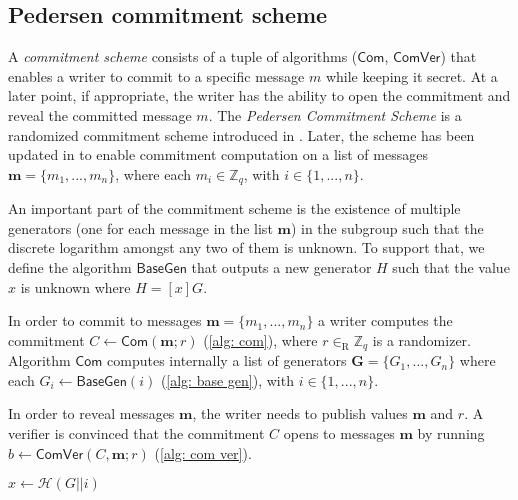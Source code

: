 \clearpage
\subsection{Pedersen commitment scheme}
A \textit{commitment scheme} consists of a tuple of algorithms ($\mathsf{Com}$, $\mathsf{ComVer}$) that enables a writer to commit to a specific message $m$ while keeping it secret. At a later point, if appropriate, the writer has the ability to open the commitment and reveal the committed message $m$. The \textit{Pedersen Commitment Scheme} is a randomized commitment scheme introduced in \cite{Pedersen91-commitment}. Later, the scheme has been updated in \cite{Bootle18} to enable commitment computation on a list of messages $\boldsymbol{m} = \{m_1, ..., m_n\}$, where each $m_i \in \mathbb{Z}_q$, with $i \in \{1, ..., n\}$.

An important part of the commitment scheme is the existence of multiple generators (one for each message in the list  $\boldsymbol{m}$) in the subgroup such that the discrete logarithm amongst any two of them is unknown. To support that, we define the algorithm $\mathsf{BaseGen}$ that outputs a new generator $H$ such that the value $x$ is unknown where $H = [x]G$.

In order to commit to messages $\boldsymbol{m} = \{m_1, ..., m_n\}$ a writer computes the commitment $C \gets \mathsf{Com}(\boldsymbol{m}; r)$ (\cref{alg: com}), where $r \in_\mathrm{R} \mathbb{Z}_q$ is a randomizer. Algorithm $\mathsf{Com}$ computes internally a list of generators $\boldsymbol{G} = \{G_1, ..., G_n\}$ where each $G_i \gets \mathsf{BaseGen}(i)$ (\cref{alg: base gen}), with $i \in \{1, ..., n\}$.

In order to reveal messages $\boldsymbol{m}$, the writer needs to publish values $\boldsymbol{m}$ and $r$. A verifier is convinced that the commitment $C$ opens to messages $\boldsymbol{m}$ by running $b \gets \mathsf{ComVer}(C, \boldsymbol{m}; r)$ (\cref{alg: com ver}).

\begin{algorithm}[ht]
    \DontPrintSemicolon
    \caption{$\mathsf{BaseGen} (i)$}
    
    $x \gets \mathcal{H}(G || i)$ \\
     
    
    \label{alg: base gen}
\end{algorithm}

